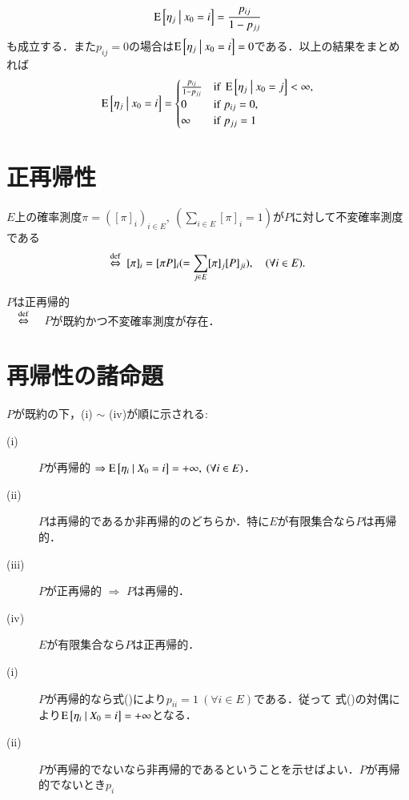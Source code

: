 \begin{prf}
\begin{align}
			\operatorname{E} \left[ \eta_j \ \middle|\ x_0 = i \right] = \frac{p_{ij}}{1 - p_{jj}}
		\end{align}
		も成立する．また$p_{ij} = 0$の場合は$\operatorname{E} \left[ \eta_j \ \middle|\ x_0 = i \right] = 0$である．以上の結果をまとめれば
		\begin{align}
			\cexp{\eta_j}{x_0 = i} = \begin{cases}
				\frac{p_{ij}}{1 - p_{jj}} & {\rm if}\ \cexp{\eta_j}{x_0 = j} < \infty, \\
				0 & {\rm if}\ p_{ij} = 0, \\
				\infty & {\rm if}\ p_{jj} = 1
			\end{cases}
		\end{align}
		\QED
	\end{prf}

\section{正再帰性}
	\begin{dfn}[不変確率測度]
		$E$上の確率測度$\pi = ([\pi]_i)_{i \in E},\ (\sum_{i \in E} [\pi]_i = 1)$が$P$に対して不変確率測度である
		\begin{align}
			\overset{\mathrm{def}}{\Leftrightarrow}\ [\pi]_i = [\pi P]_i ( = \sum_{j \in E}[\pi]_j [P]_{ji} ), \quad (\forall i \in E).
		\end{align}
	\end{dfn}
	\begin{dfn}[正再帰性]
		$P$は正再帰的 \\
		$\quad\overset{\mathrm{def}}{\Leftrightarrow}\quad$ $P$が既約かつ不変確率測度が存在． 
	\end{dfn}
\section{再帰性の諸命題}
	\begin{prp}
		$P$が既約の下，(i) $\sim$ (iv)が順に示される:
		\begin{description}
			\item[\rm{(i)}] $P$が再帰的 $\Rightarrow \operatorname{E} \left[ \eta_i \ \middle|\ X_0 = i \right] = +\infty, \ (\forall i \in E)$．
			\item[\rm{(ii)}] $P$は再帰的であるか非再帰的のどちらか．特に$E$が有限集合なら$P$は再帰的．
			\item[\rm{(iii)}] $P$が正再帰的 $\Rightarrow$ $P$は再帰的．
			\item[\rm{(iv)}] $E$が有限集合なら$P$は正再帰的．
		\end{description}
	\end{prp}
	\begin{prf}\mbox{}
		\begin{description}
			\item[\rm{(i)}] $P$が再帰的なら式()により$p_{ii}=1\ (\forall i \in E)$である．従って
				式()の対偶により$\operatorname{E} \left[ \eta_i \ \middle|\ X_0 = i \right] = +\infty$となる．
			\item[\rm{(ii)}] $P$が再帰的でないなら非再帰的であるということを示せばよい．$P$が再帰的でないとき$p_{i}$
		\end{description}
	\end{prf}

